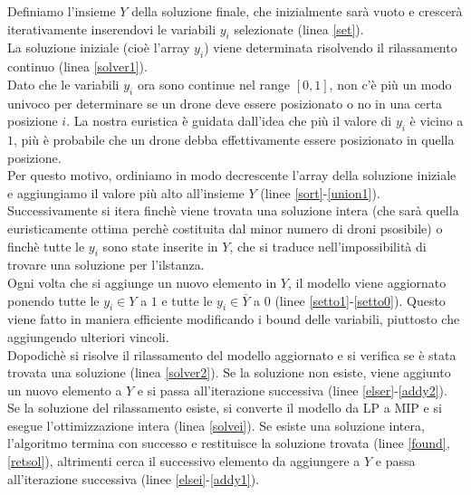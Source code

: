 Definiamo l'insieme $Y$ della soluzione finale, che inizialmente sarà vuoto e crescerà iterativamente inserendovi le variabili $y_i$ selezionate (linea \ref{set}). \\
La soluzione iniziale (cioè l'array $y_i$) viene determinata risolvendo il rilassamento continuo (linea \ref{solver1}). \\
Dato che le variabili $y_i$ ora sono continue nel range $[0,1]$, non c'è più un modo univoco per determinare se un drone deve essere posizionato o no in una certa posizione $i$.  
La nostra euristica è guidata dall'idea che più il valore di $y_i$ è vicino a $1$, più è probabile che un drone debba effettivamente essere posizionato in quella posizione. \\
Per questo motivo, ordiniamo in modo decrescente l'array della soluzione iniziale e aggiungiamo il valore più alto all'insieme $Y$ (linee \ref{sort}-\ref{union1}). \\
Successivamente si itera finchè viene trovata una soluzione intera (che sarà quella euristicamente ottima perchè costituita dal minor numero di droni psosibile) o finchè tutte le $y_i$ sono state inserite in $Y$, che si traduce nell'impossibilità di trovare una soluzione per l'ilstanza.\\
Ogni volta che si aggiunge un nuovo elemento in $Y$, il modello viene aggiornato ponendo tutte le $y_i \in Y$ a $1$ e tutte le $y_i \in \bar{Y}$ a $0$ (linee \ref{setto1}-\ref{setto0}). Questo viene fatto in maniera efficiente modificando i bound delle variabili, piuttosto che aggiungendo ulteriori vincoli. \\
Dopodichè si risolve il rilassamento del modello aggiornato e si verifica se è stata trovata una soluzione (linea \ref{solver2}). 
Se la soluzione non esiste, viene aggiunto un nuovo elemento a $Y$ e si passa all'iterazione successiva (linee \ref{elser}-\ref{addy2}). \\
Se la soluzione del rilassamento esiste, si converte il modello da LP a MIP e si esegue l'ottimizzazione intera (linea \ref{solvei}).
Se esiste una soluzione intera, l'algoritmo termina con successo e restituisce la soluzione trovata (linee \ref{found},\ref{retsol}), altrimenti cerca il successivo elemento da aggiungere a $Y$ e passa all'iterazione successiva (linee \ref{elsei}-\ref{addy1}).

